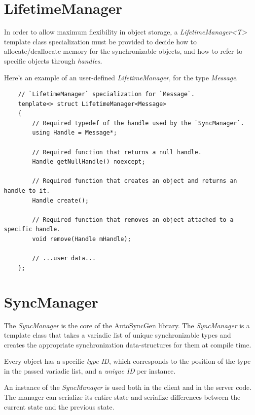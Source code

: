 \documentclass{report}
\begin{document}
        \section{LifetimeManager}

            In order to allow maximum flexibility in object storage, a \emph{LifetimeManager<T>} template class specialization must be provided to decide how to allocate/deallocate memory for the synchronizable objects, and how to refer to specific objects through \emph{handles}.

            Here's an example of an user-defined \emph{LifetimeManager}, for the type \emph{Message}.

\begin{verbatim}    
    // `LifetimeManager` specialization for `Message`.
    template<> struct LifetimeManager<Message>
    {
        // Required typedef of the handle used by the `SyncManager`.
        using Handle = Message*;

        // Required function that returns a null handle.
        Handle getNullHandle() noexcept;

        // Required function that creates an object and returns an handle to it.
        Handle create();

        // Required function that removes an object attached to a specific handle.
        void remove(Handle mHandle);
        
        // ...user data...
    };
\end{verbatim}

        \section{SyncManager}

            The \emph{SyncManager} is the core of the AutoSyncGen library. 
            The \emph{SyncManager} is a template class that takes a variadic list of unique synchronizable types and creates the appropriate synchronization data-structures for them at compile time.

            Every object has a specific \emph{type ID}, which corresponds to the position of the type in the passed variadic list, and a \emph{unique ID} per instance.

            An instance of the \emph{SyncManager} is used both in the client and in the server code. The manager can serialize its entire state and serialize differences between the current state and the previous state.
\end{document}
